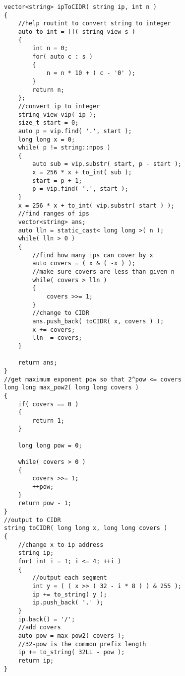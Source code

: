 \setcounter{lstlisting}{0}
\begin{lstlisting}[style=customc, caption={Greedy}]
vector<string> ipToCIDR( string ip, int n )
{
    //help routint to convert string to integer
    auto to_int = []( string_view s )
    {
        int n = 0;
        for( auto c : s )
        {
            n = n * 10 + ( c - '0' );
        }
        return n;
    };
    //convert ip to integer
    string_view vip( ip );
    size_t start = 0;
    auto p = vip.find( '.', start );
    long long x = 0;
    while( p != string::npos )
    {
        auto sub = vip.substr( start, p - start );
        x = 256 * x + to_int( sub );
        start = p + 1;
        p = vip.find( '.', start );
    }
    x = 256 * x + to_int( vip.substr( start ) );
    //find ranges of ips
    vector<string> ans;
    auto lln = static_cast< long long >( n );
    while( lln > 0 )
    {
        //find how many ips can cover by x
        auto covers = ( x & ( -x ) );
        //make sure covers are less than given n
        while( covers > lln )
        {
            covers >>= 1;
        }
        //change to CIDR
        ans.push_back( toCIDR( x, covers ) );
        x += covers;
        lln -= covers;
    }

    return ans;
}
//get maximum exponent pow so that 2^pow <= covers
long long max_pow2( long long covers )
{
    if( covers == 0 )
    {
        return 1;
    }

    long long pow = 0;

    while( covers > 0 )
    {
        covers >>= 1;
        ++pow;
    }
    return pow - 1;
}
//output to CIDR
string toCIDR( long long x, long long covers )
{
    //change x to ip address
    string ip;
    for( int i = 1; i <= 4; ++i )
    {
        //output each segment
        int y = ( ( x >> ( 32 - i * 8 ) ) & 255 );
        ip += to_string( y );
        ip.push_back( '.' );
    }
    ip.back() = '/';
    //add covers
    auto pow = max_pow2( covers );
    //32-pow is the common prefix length
    ip += to_string( 32LL - pow );
    return ip;
}
\end{lstlisting}
